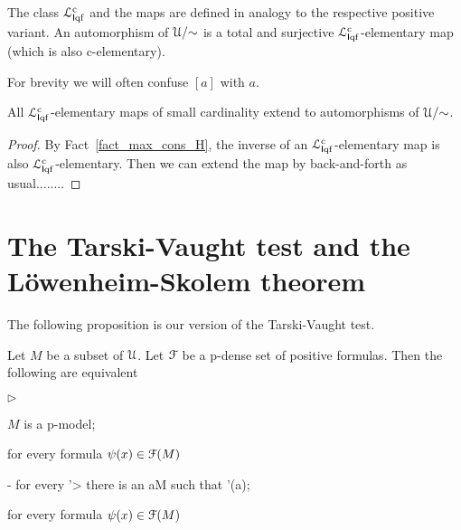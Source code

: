 \documentclass[10pt,oneside]{amsproc}
\newcommand{\mylabel}[1]{{#1}\hfill}
\renewenvironment{itemize}
  {\begin{list}{$\triangleright$}{%
  \setlength{\parskip}{0mm}
  \setlength{\topsep}{.4\baselineskip}
  \setlength{\rightmargin}{0mm}
  \setlength{\listparindent}{0mm}
  \setlength{\itemindent}{0mm}
  \setlength{\labelwidth}{3ex}
  \setlength{\itemsep}{.2\baselineskip}
  \setlength{\parsep}{.2\baselineskip}
  \setlength{\partopsep}{0mm}
  \setlength{\labelsep}{1ex}
  \setlength{\leftmargin}{\labelwidth+\labelsep}
  \let\makelabel\mylabel}}{%
\end{list}}
\renewcommand*{\emph}[1]{%
   \smash{\tikz[baseline]\node[rectangle, fill=teal!25, rounded corners, inner xsep=0.5ex, inner ysep=0.2ex, anchor=base, minimum height = 2.7ex]{\strut #1};}}
\begin{document}
{The class ${\EuScript L}^{\rm c}_{{\sf I}{\rm qf}}$ and the \emph{${\EuScript L}^{\rm c}_{{\sf I}{\rm qf}}$-elementary\/} maps are defined in analogy to the respective positive variant.
An automorphism of ${\EuScript U}/{\sim}$ is a total and surjective  ${\EuScript L}^{\rm c}_{{\sf I}{\rm qf}}$-elementary map (which is also c-elementary).

For brevity we will often confuse $[a]$ with $a$.

\begin{proposition}
  All ${\EuScript L}^{\rm c}_{{\sf I}{\rm qf}}$-elementary maps of small cardinality extend to automorphisms of ${\EuScript U}/{\sim}$.
\end{proposition}

\begin{proof}
  By Fact~\ref{fact_max_cons_H}, the inverse of an ${\EuScript L}^{\rm c}_{{\sf I}{\rm qf}}$-elementary map is also ${\EuScript L}^{\rm c}_{{\sf I}{\rm qf}}$-elementary.
  Then we can extend the map by back-and-forth as usual........
\end{proof}



 
\section{The Tarski-Vaught test and the L\"owenheim-Skolem theorem}

The following proposition is our version of the Tarski-Vaught test.

\begin{proposition}\label{prop_Tarski_Vaught}
  Let $M$ be a subset of ${\EuScript U}$.
  Let ${\EuScript F}$ be a p-dense set of positive formulas.
  Then the following are equivalent
  \begin{itemize}
    \item[1.] $M$ is a p-model;
    \item[2.] for every formula $\psi(x)\in{\EuScript F}(M)$
    
    \noindent\kern-\leftmargin
    {\textrm{ for every }\psi'>\psi\textrm{ there is an }a\in M\textrm{ such that }\psi'(a);}
  
    \item[3.] for every formula $\psi(x)\in{\EuScript F}(M)$
    

\end{itemize}
\end{proposition}}
\end{document}
